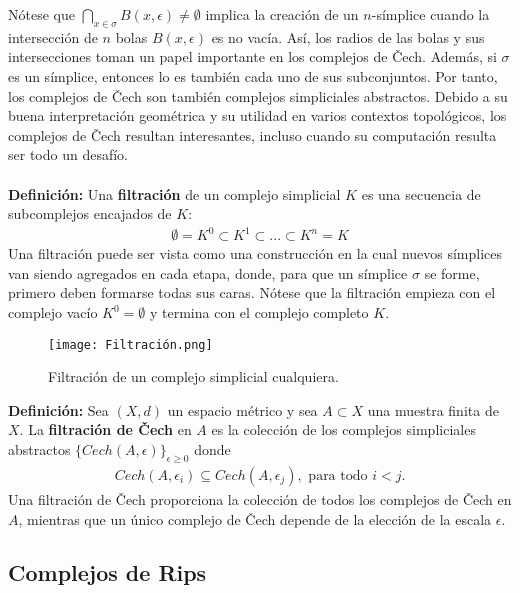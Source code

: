 \documentclass{article}
\begin{document}
Nótese que $\bigcap_{x\in \sigma}B(x,\epsilon )\neq \emptyset$ implica la creación de un $n$-símplice cuando la intersección de $n$ bolas $B(x,\epsilon )$ es no vacía. Así, los radios de las bolas y sus intersecciones toman un papel importante en los complejos de Čech. Además, si $\sigma$ es un símplice, entonces lo es también cada uno de sus subconjuntos. Por tanto, los complejos de Čech son también complejos simpliciales abstractos. Debido a su buena interpretación geométrica y su utilidad en varios contextos topológicos, los complejos de Čech resultan interesantes, incluso cuando su computación resulta ser todo un desafío.\\
\\
\textbf{Definición:} Una \textbf{filtración} de un complejo simplicial $K$ es una secuencia de subcomplejos encajados de $K$: 
\begin{align*}
    \emptyset = K^{0}\subset K^{1}\subset ... \subset K^{n}=K
\end{align*}
Una filtración puede ser vista como una construcción en la cual nuevos símplices van siendo agregados en cada etapa, donde, para que un símplice $\sigma$ se forme, primero deben formarse todas sus caras. Nótese que la filtración empieza con el complejo vacío $K^{0}=\emptyset$ y termina con el complejo completo $K$.
\begin{figure}[h]
  \centering
  \texttt{[image: Filtración.png]}
  \caption{Filtración de un complejo simplicial cualquiera.}
  \label{fig:mi_imagen}
\end{figure}
\textbf{Definición:} Sea $(X, d)$ un espacio métrico y sea $A \subset X$ una muestra finita de $X$. La \textbf{filtración de Čech} en $A$ es la colección de los complejos simpliciales abstractos $\{Cech(A,\epsilon)\}_{\epsilon \geq 0}$ donde
\begin{align*}
    Cech(A,\epsilon_{i}) \subseteq Cech(A,\epsilon_{j}), \text{ para todo } i < j.
\end{align*}
Una filtración de Čech proporciona la colección de todos los complejos de Čech en $A$, mientras que un único complejo de Čech depende de la elección de la escala $\epsilon$.





\subsection{Complejos de Rips}
\end{document}
